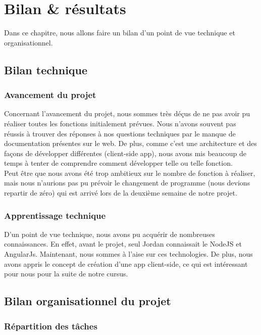 \chapter{Bilan \& résultats}

Dans ce chapitre, nous allons faire un bilan d'un point de vue technique et organisationnel.

\section{Bilan technique}

\subsection{Avancement du projet}

Concernant l'avancement du projet, nous sommes très déçus de ne pas avoir pu réaliser toutes les fonctions initialement prévues. Nous n'avons souvent pas réussis à trouver des réponses à nos questions techniques par le manque de documentation présentes sur le web. De plus, comme c'est une architecture et des façons de développer différentes (client-side app), nous avons mis beaucoup de temps à tenter de comprendre comment développer telle ou telle fonction. \\

Peut être que nous avons été trop ambitieux sur le nombre de fonction à réaliser, mais nous n'aurions pas pu prévoir le changement de programme (nous devions repartir de zéro) qui est arrivé lors de la deuxième semaine de notre projet.

\subsection{Apprentissage technique}

D'un point de vue technique, nous avons pu acquérir de nombreuses connaissances. En effet, avant le projet, seul Jordan connaissait le NodeJS et AngularJs. Maintenant, nous sommes à l'aise sur ces technologies. De plus, nous avons appris le concept de création d'une app client-side, ce qui est intéressant pour nous pour la suite de notre cursus.

\section{Bilan organisationnel du projet}

\subsection{Répartition des tâches}

